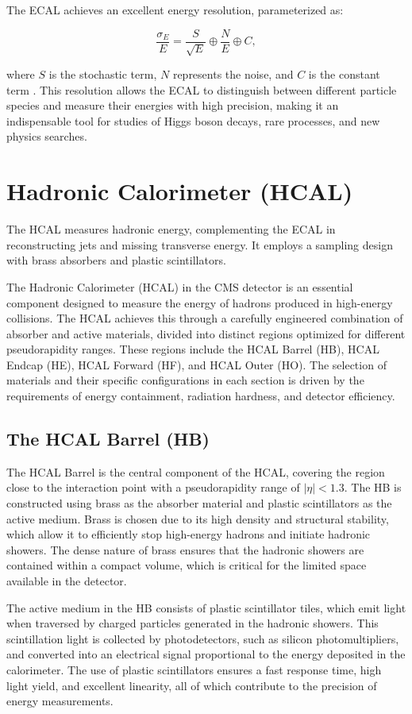 The ECAL achieves an excellent energy resolution, parameterized as:

\[
\frac{\sigma_E}{E} = \frac{S}{\sqrt{E}} \oplus \frac{N}{E} \oplus C,
\]

where $S$ is the stochastic term, $N$ represents the noise, and $C$ is the constant term \cite{ecal_tdr}. This resolution allows the ECAL to distinguish between different particle species and measure their energies with high precision, making it an indispensable tool for studies of Higgs boson decays, rare processes, and new physics searches.

\section{Hadronic Calorimeter (HCAL)}
The HCAL measures hadronic energy, complementing the ECAL in reconstructing jets and missing transverse energy. It employs a sampling design with brass absorbers and plastic scintillators.

The Hadronic Calorimeter (HCAL) in the CMS detector is an essential component designed to measure the energy of hadrons produced in high-energy collisions. The HCAL achieves this through a carefully engineered combination of absorber and active materials, divided into distinct regions optimized for different pseudorapidity ranges. These regions include the HCAL Barrel (HB), HCAL Endcap (HE), HCAL Forward (HF), and HCAL Outer (HO). The selection of materials and their specific configurations in each section is driven by the requirements of energy containment, radiation hardness, and detector efficiency.

\subsection{The HCAL Barrel (HB)}
The HCAL Barrel is the central component of the HCAL, covering the region close to the interaction point with a pseudorapidity range of $|\eta| < 1.3$. The HB is constructed using brass as the absorber material and plastic scintillators as the active medium. Brass is chosen due to its high density and structural stability, which allow it to efficiently stop high-energy hadrons and initiate hadronic showers.\cite{hcal_tdr} The dense nature of brass ensures that the hadronic showers are contained within a compact volume, which is critical for the limited space available in the detector.

The active medium in the HB consists of plastic scintillator tiles, which emit light when traversed by charged particles generated in the hadronic showers. This scintillation light is collected by photodetectors, such as silicon photomultipliers, and converted into an electrical signal proportional to the energy deposited in the calorimeter. The use of plastic scintillators ensures a fast response time, high light yield, and excellent linearity, all of which contribute to the precision of energy measurements.

